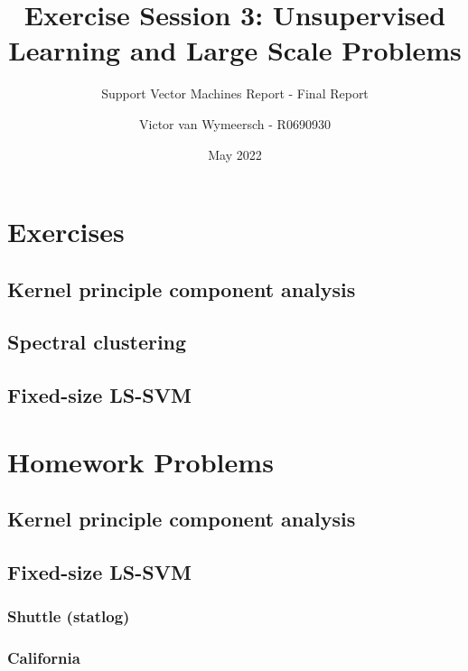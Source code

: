 \documentclass{article}
\title{Exercise Session 3: Unsupervised Learning and Large Scale Problems}
\subtitle{\Large{Support Vector Machines Report - Final Report}}
\author{Victor van Wymeersch - R0690930}
\date{May 2022}
\begin{document}
\maketitle
    
    


\section{Exercises}
    \subsection{Kernel principle component analysis} 
    
    \subsection{Spectral clustering} 
    
    \subsection{Fixed-size LS-SVM}
    
\section{Homework Problems} 
    \subsection{Kernel principle component analysis}
        
    \subsection{Fixed-size LS-SVM}
    
        \subsubsection{Shuttle (statlog)}
        
        \subsubsection{California}
\end{document}
